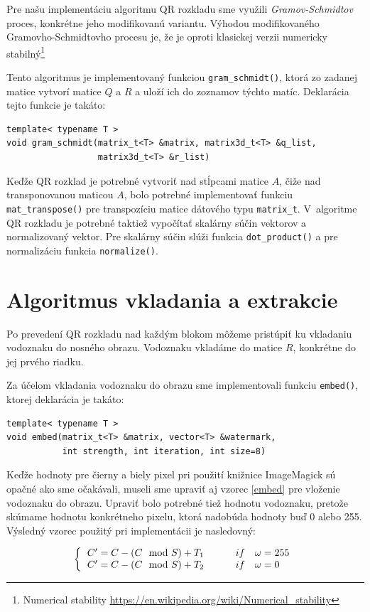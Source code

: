 Pre našu implementáciu algoritmu QR rozkladu sme využili {\it Gramov-Schmidtov} proces, konkrétne jeho modifikovanú variantu. Výhodou modifikovaného Gramovho-Schmidtovho procesu je, že je oproti klasickej verzii numericky stabilný\footnote{Numerical stability \url{https://en.wikipedia.org/wiki/Numerical_stability}} 

Tento algoritmus je implementovaný funkciou {\tt gram\_schmidt()}, ktorá zo zadanej matice vytvorí matice $Q$ a $R$ a uloží ich do zoznamov týchto matíc. Deklarácia tejto funkcie je takáto:
\begin{lstlisting}
template< typename T >
void gram_schmidt(matrix_t<T> &matrix, matrix3d_t<T> &q_list,
                  matrix3d_t<T> &r_list)
\end{lstlisting}

Keďže QR rozklad je potrebné vytvoriť nad stĺpcami matice $A$, čiže nad transponovanou maticou $A$, bolo potrebné implementovať funkciu {\tt mat\_transpose()} pre transpozíciu matice dátového typu {\tt matrix\_t}. V~algoritme QR rozkladu je potrebné taktiež vypočítať skalárny súčin vektorov a normalizovaný vektor. Pre skalárny súčin slúži funkcia {\tt dot\_product()} a pre normalizáciu funkcia {\tt normalize()}.
\clearpage
\section{Algoritmus vkladania a extrakcie}
\label{impl:embed-extract}
Po prevedení QR rozkladu nad každým blokom môžeme pristúpiť ku vkladaniu vodoznaku do nosného obrazu. Vodoznaku vkladáme do matice $R$, konkrétne do jej prvého riadku.

Za účelom vkladania vodoznaku do obrazu sme implementovali funkciu {\tt embed()}, ktorej deklarácia je takáto:
\begin{lstlisting}
template< typename T >
void embed(matrix_t<T> &matrix, vector<T> &watermark,
           int strength, int iteration, int size=8)
\end{lstlisting}

Keďže hodnoty pre čierny a biely pixel pri použití knižnice ImageMagick sú opačné ako sme očakávali, museli sme upraviť aj vzorec \ref{embed} pre vloženie vodoznaku do obrazu. Upraviť bolo potrebné tiež hodnotu vodoznaku, pretože skúmame hodnotu konkrétneho pixelu, ktorá nadobúda hodnoty buď 0 alebo 255. Výsledný vzorec použitý pri implementácii je nasledovný:

\begin{equation} \label{embed-mod}
\left \{
  \begin{tabular}{ll}
  $C' = C - (C\mod S) + T_1 \qquad$ & $if \quad \omega = 255$ \\
  $C' = C - (C\mod S) + T_2 \qquad$ & $if \quad \omega = 0$
  \end{tabular}
\right.
\end{equation}


